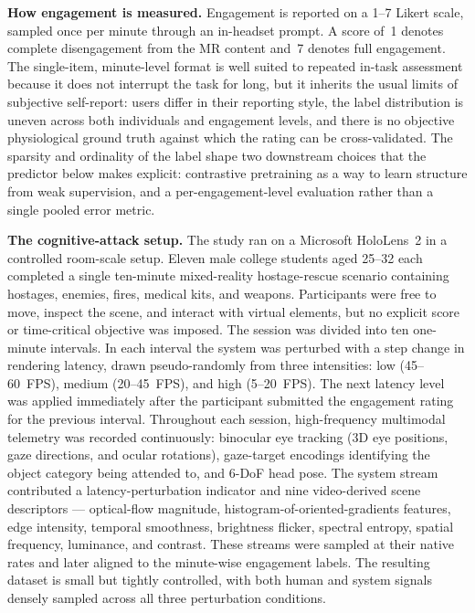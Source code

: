 \documentclass[graybox]{svmult}
\begin{document}
\textbf{How engagement is measured.}
Engagement is reported on a 1--7 Likert scale, sampled once per minute through an in-headset prompt. A score of~1 denotes complete disengagement from the MR content and~7 denotes full engagement. The single-item, minute-level format is well suited to repeated in-task assessment because it does not interrupt the task for long, but it inherits the usual limits of subjective self-report: users differ in their reporting style, the label distribution is uneven across both individuals and engagement levels, and there is no objective physiological ground truth against which the rating can be cross-validated. The sparsity and ordinality of the label shape two downstream choices that the predictor below makes explicit: contrastive pretraining as a way to learn structure from weak supervision, and a per-engagement-level evaluation rather than a single pooled error metric.

\textbf{The cognitive-attack setup.}
The study \citep{engagement2026mr} ran on a Microsoft HoloLens~2 in a controlled room-scale setup. Eleven male college students aged 25--32 each completed a single ten-minute mixed-reality hostage-rescue scenario containing hostages, enemies, fires, medical kits, and weapons. Participants were free to move, inspect the scene, and interact with virtual elements, but no explicit score or time-critical objective was imposed. The session was divided into ten one-minute intervals. In each interval the system was perturbed with a step change in rendering latency, drawn pseudo-randomly from three intensities: low (45--60~FPS), medium (20--45~FPS), and high (5--20~FPS). The next latency level was applied immediately after the participant submitted the engagement rating for the previous interval. Throughout each session, high-frequency multimodal telemetry was recorded continuously: binocular eye tracking (3D eye positions, gaze directions, and ocular rotations), gaze-target encodings identifying the object category being attended to, and 6-DoF head pose. The system stream contributed a latency-perturbation indicator and nine video-derived scene descriptors --- optical-flow magnitude, histogram-of-oriented-gradients features, edge intensity, temporal smoothness, brightness flicker, spectral entropy, spatial frequency, luminance, and contrast. These streams were sampled at their native rates and later aligned to the minute-wise engagement labels. The resulting dataset is small but tightly controlled, with both human and system signals densely sampled across all three perturbation conditions.
\end{document}
